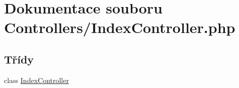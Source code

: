 \hypertarget{_index_controller_8php}{\section{Dokumentace souboru Controllers/\-Index\-Controller.php}
\label{_index_controller_8php}
}
\subsection*{Třídy}
\begin{DoxyCompactItemize}
\item 
class \hyperlink{class_index_controller}{Index\-Controller}
\end{DoxyCompactItemize}
